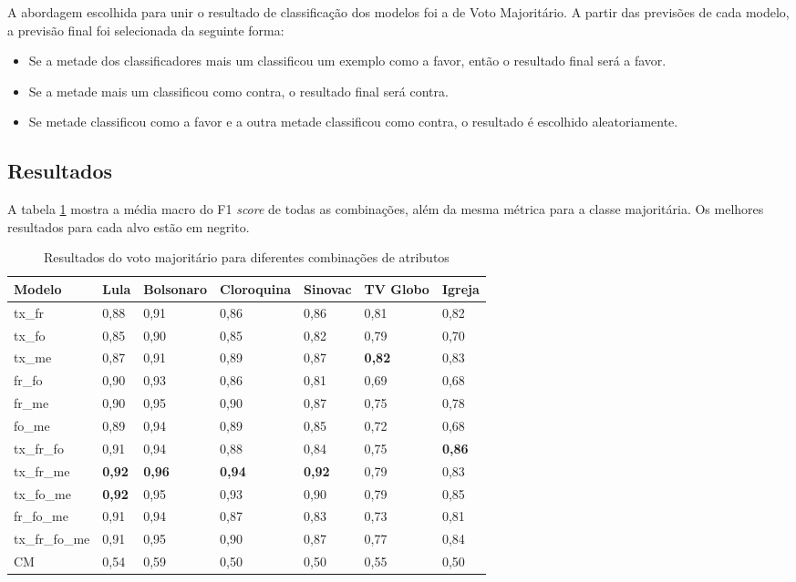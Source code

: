 \documentclass[
	12pt, oneside, a4paper, english, brazil
]{abntex2ppgsi}
\begin{document}
A abordagem escolhida para unir o resultado de classificação dos modelos foi a de Voto Majoritário. A partir das previsões de cada modelo, a previsão final foi selecionada da seguinte forma:
\begin{itemize}
    \item Se a metade dos classificadores mais um classificou um exemplo como a favor, então o resultado final será a favor.
    \item Se a metade mais um classificou como contra, o resultado final será contra.
    \item Se metade classificou como a favor e a outra metade classificou como contra, o resultado é escolhido aleatoriamente.
\end{itemize}

\subsection{Resultados}
A tabela \ref{tab:f1-macro-avg-voto-majoritario} mostra a média macro do F1 {\em score} de todas as combinações, além da mesma métrica para a classe majoritária. Os melhores resultados para cada alvo estão em negrito.

\begin{table}[ht]
\centering
\caption{Resultados do voto majoritário para diferentes combinações de atributos}
\label{tab:f1-macro-avg-voto-majoritario}
\begin{tabular}{ lllllll }
\hline
Modelo & Lula & Bolsonaro & Cloroquina & Sinovac & TV Globo & Igreja \\
\hline
tx\_fr & 0,88 & 0,91 & 0,86 & 0,86 & 0,81 & 0,82 \\
tx\_fo & 0,85 & 0,90 & 0,85 & 0,82 & 0,79 & 0,70 \\
tx\_me & 0,87 & 0,91 & 0,89 & 0,87 & \textbf{0,82} & 0,83 \\
fr\_fo & 0,90 & 0,93 & 0,86 & 0,81 & 0,69 & 0,68 \\
fr\_me & 0,90 & 0,95 & 0,90 & 0,87 & 0,75 & 0,78 \\
fo\_me & 0,89 & 0,94 & 0,89 & 0,85 & 0,72 & 0,68 \\
tx\_fr\_fo & 0,91 & 0,94 & 0,88 & 0,84 & 0,75 & \textbf{0,86} \\
tx\_fr\_me & \textbf{0,92} & \textbf{0,96} & \textbf{0,94} & \textbf{0,92} & 0,79 & 0,83 \\
tx\_fo\_me & \textbf{0,92} & 0,95 & 0,93 & 0,90 & 0,79 & 0,85 \\
fr\_fo\_me & 0,91 & 0,94 & 0,87 & 0,83 & 0,73 & 0,81 \\
tx\_fr\_fo\_me & 0,91 & 0,95 & 0,90 & 0,87 & 0,77 & 0,84 \\
\hline
CM & 0,54 & 0,59 & 0,50 & 0,50 & 0,55 & 0,50 \\
\hline
\end{tabular}
\end{table}
\end{document}
